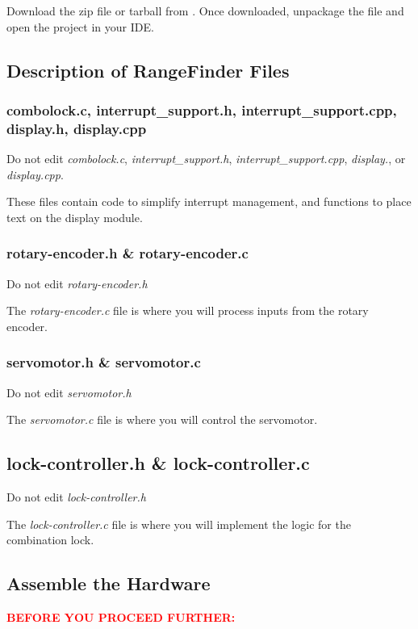 Download the zip file or tarball from \filesource.
Once downloaded, unpackage the file and open the project in your IDE\@.

\subsection{Description of RangeFinder Files}

\subsubsection{combolock.c, interrupt\_support.h, interrupt\_support.cpp, display.h, display.cpp}

Do not edit \textit{combolock.c}, \textit{interrupt\_support.h}, \textit{interrupt\_support.cpp}, \textit{display.}, or \textit{display.cpp}.

These files contain code to simplify interrupt management, and functions to place text on the display module.

\subsubsection{rotary-encoder.h \& rotary-encoder.c}

Do not edit \textit{rotary-encoder.h}

The \textit{rotary-encoder.c} file is where you will process inputs from the rotary encoder.

\subsubsection{servomotor.h \& servomotor.c}

Do not edit \textit{servomotor.h}

The \textit{servomotor.c} file is where you will control the servomotor.

\subsection{lock-controller.h \& lock-controller.c}

Do not edit \textit{lock-controller.h}

The \textit{lock-controller.c} file is where you will implement the logic for the combination lock.

%
%


\subsection{Assemble the Hardware}

\textcolor{red}{\textbf{BEFORE YOU PROCEED FURTHER:}}
\begin{description}
\end{description}

